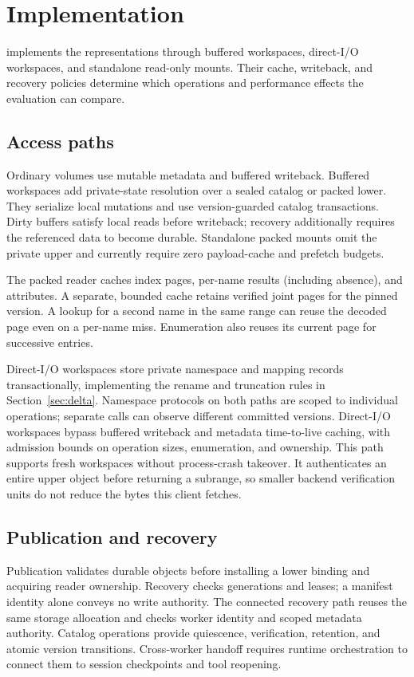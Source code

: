 \section{Implementation}
\label{sec:implementation}

\sys implements the representations through buffered workspaces,
direct-I/O workspaces, and standalone read-only mounts. Their cache,
writeback, and recovery policies determine which operations and
performance effects the evaluation can compare.

\subsection{Access paths}

Ordinary volumes use mutable metadata and buffered writeback.
Buffered workspaces add private-state resolution over a sealed catalog
or packed lower. They serialize local mutations and use version-guarded
catalog transactions. Dirty buffers satisfy local reads before writeback;
recovery additionally requires the referenced data to become durable.
Standalone packed mounts omit the private upper and currently require
zero payload-cache and prefetch budgets.

The packed reader caches index pages, per-name results (including
absence), and attributes. A separate, bounded cache retains verified
joint pages for the pinned version. A lookup for a second name in the
same range can reuse the decoded page even on a per-name miss.
Enumeration also reuses its current page for successive entries.

Direct-I/O workspaces store private namespace and mapping records
transactionally, implementing the rename and truncation rules in
Section~\ref{sec:delta}. Namespace protocols on both paths are scoped
to individual operations; separate calls can observe different committed
versions. Direct-I/O workspaces bypass buffered writeback and metadata
time-to-live caching, with admission bounds on operation sizes,
enumeration, and ownership. This path supports fresh workspaces without
process-crash takeover. It authenticates an entire upper object before
returning a subrange, so smaller backend verification units do not
reduce the bytes this client fetches.

\subsection{Publication and recovery}

Publication validates durable objects before installing a lower binding
and acquiring reader ownership. Recovery checks generations and leases;
a manifest identity alone conveys no write authority. The connected
recovery path reuses the same storage allocation and checks worker
identity and scoped metadata authority. Catalog operations provide
quiescence, verification, retention, and atomic version transitions.
Cross-worker handoff requires runtime orchestration to connect them to
session checkpoints and tool reopening.

